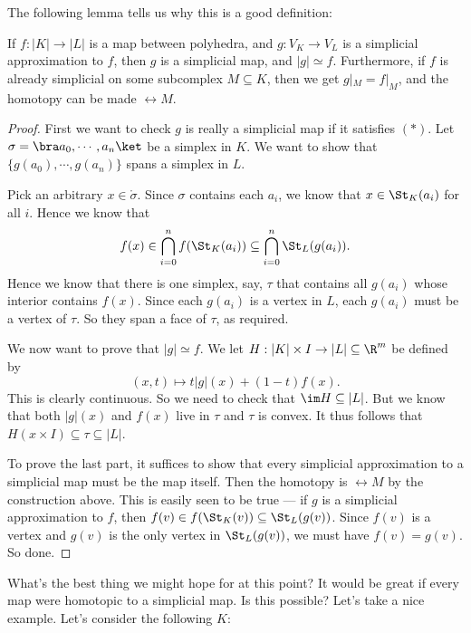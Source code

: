 \documentclass[a4paper]{article}
\begin{document}
The following lemma tells us why this is a good definition:
\begin{lemma}
  If $f: |K| \to |L|$ is a map between polyhedra, and $g: V_K \to V_L$ is a simplicial approximation to $f$, then $g$ is a simplicial map, and $|g| \simeq f$. Furthermore, if $f$ is already simplicial on some subcomplex $M\subseteq K$, then we get $g|_M = f|_M$, and the homotopy can be made $\rel M$.
\end{lemma}

\begin{proof}
  First we want to check $g$ is really a simplicial map if it satisfies $(*)$. Let $\sigma = \bra a_0,\cdots, a_n\ket$ be a simplex in $K$. We want to show that $\{g(a_0), \cdots, g(a_n)\}$ spans a simplex in $L$.

  Pick an arbitrary $x \in \mathring{\sigma}$. Since $\sigma$ contains each $a_i$, we know that $x \in \St_K(a_i)$ for all $i$. Hence we know that
  \[
    f(x) \in \bigcap_{i = 0}^n f(\St_K(a_i)) \subseteq \bigcap_{i = 0}^n \St_L(g(a_i)).
  \]
  Hence we know that there is one simplex, say, $\tau$ that contains all $g(a_i)$ whose interior contains $f(x)$. Since each $g(a_i)$ is a vertex in $L$, each $g(a_i)$ must be a vertex of $\tau$. So they span a face of $\tau$, as required.

  We now want to prove that $|g| \simeq f$. We let $H: |K| \times I \to |L| \subseteq \R^m$ be defined by
  \[
    (x, t) \mapsto t |g|(x) + (1 - t)f(x).
  \]
  This is clearly continuous. So we need to check that $\im H \subseteq |L|$. But we know that both $|g|(x)$ and $f(x)$ live in $\tau$ and $\tau$ is convex. It thus follows that $H(x \times I) \subseteq \tau \subseteq |L|$.

  To prove the last part, it suffices to show that every simplicial approximation to a simplicial map must be the map itself. Then the homotopy is $\rel M$ by the construction above. This is easily seen to be true --- if $g$ is a simplicial approximation to $f$, then $f(v) \in f(\St_K(v)) \subseteq \St_L(g(v))$. Since $f(v)$ is a vertex and $g(v)$ is the only vertex in $\St_L(g(v))$, we must have $f(v) = g(v)$. So done.
\end{proof}
What's the best thing we might hope for at this point? It would be great if every map were homotopic to a simplicial map. Is this possible? Let's take a nice example. Let's consider the following $K$:
\begin{center}
\end{center}
\end{document}
